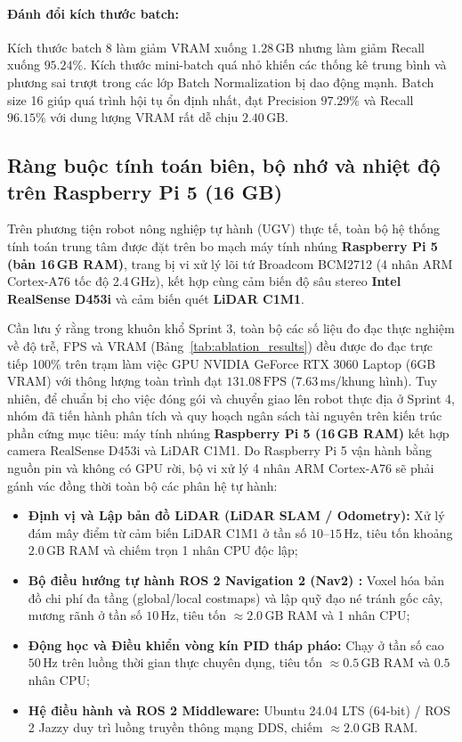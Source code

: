 \documentclass[12pt,a4paper]{article}
\begin{document}
\paragraph{Đánh đổi kích thước batch:}
Kích thước batch 8 làm giảm VRAM xuống $1.28\,\text{GB}$ nhưng làm giảm Recall xuống $95.24\%$. Kích thước mini-batch quá nhỏ khiến các thống kê trung bình và phương sai trượt trong các lớp Batch Normalization bị dao động mạnh. Batch size 16 giúp quá trình hội tụ ổn định nhất, đạt Precision $97.29\%$ và Recall $96.15\%$ với dung lượng VRAM rất dễ chịu $2.40\,\text{GB}$.

\subsection{Ràng buộc tính toán biên, bộ nhớ và nhiệt độ trên Raspberry Pi 5 (16 GB)}
Trên phương tiện robot nông nghiệp tự hành (UGV) thực tế, toàn bộ hệ thống tính toán trung tâm được đặt trên bo mạch máy tính nhúng \textbf{Raspberry Pi 5 (bản 16\,GB RAM)}, trang bị vi xử lý lõi tứ Broadcom BCM2712 (4 nhân ARM Cortex-A76 tốc độ 2.4\,GHz), kết hợp cùng cảm biến độ sâu stereo \textbf{Intel RealSense D453i} và cảm biến quét \textbf{LiDAR C1M1}.

Cần lưu ý rằng trong khuôn khổ Sprint 3, toàn bộ các số liệu đo đạc thực nghiệm về độ trễ, FPS và VRAM (Bảng~\ref{tab:ablation_results}) đều được đo đạc trực tiếp 100\% trên trạm làm việc GPU NVIDIA GeForce RTX 3060 Laptop (6GB VRAM) với thông lượng toàn trình đạt $131.08\,\text{FPS}$ ($7.63\,\text{ms}$/khung hình). Tuy nhiên, để chuẩn bị cho việc đóng gói và chuyển giao lên robot thực địa ở Sprint 4, nhóm đã tiến hành phân tích và quy hoạch ngân sách tài nguyên trên kiến trúc phần cứng mục tiêu: máy tính nhúng \textbf{Raspberry Pi 5 (16\,GB RAM)} kết hợp camera RealSense D453i và LiDAR C1M1. Do Raspberry Pi 5 vận hành bằng nguồn pin và không có GPU rời, bộ vi xử lý 4 nhân ARM Cortex-A76 sẽ phải gánh vác đồng thời toàn bộ các phân hệ tự hành:
\begin{itemize}
    \item \textbf{Định vị và Lập bản đồ LiDAR (LiDAR SLAM / Odometry):} Xử lý đám mây điểm từ cảm biến LiDAR C1M1 ở tần số $10\text{--}15\,\text{Hz}$, tiêu tốn khoảng $2.0\,\text{GB}$ RAM và chiếm trọn 1 nhân CPU độc lập;
    \item \textbf{Bộ điều hướng tự hành ROS 2 Navigation 2 (Nav2) \cite{macenski2020marathon}:} Voxel hóa bản đồ chi phí đa tầng (global/local costmaps) và lập quỹ đạo né tránh gốc cây, mương rãnh ở tần số $10\,\text{Hz}$, tiêu tốn $\approx 2.0\,\text{GB}$ RAM và 1 nhân CPU;
    \item \textbf{Động học và Điều khiển vòng kín PID tháp pháo:} Chạy ở tần số cao $50\,\text{Hz}$ trên luồng thời gian thực chuyên dụng, tiêu tốn $\approx 0.5\,\text{GB}$ RAM và $0.5$ nhân CPU;
    \item \textbf{Hệ điều hành và ROS 2 Middleware:} Ubuntu 24.04 LTS (64-bit) / ROS 2 Jazzy duy trì luồng truyền thông mạng DDS, chiếm $\approx 2.0\,\text{GB}$ RAM.
\end{itemize}
\end{document}

